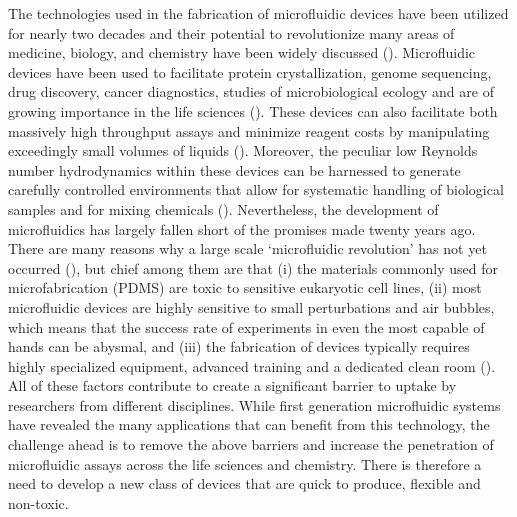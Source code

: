 \documentclass{jfm}
\begin{document}
The technologies used in the fabrication of microfluidic devices have been utilized for nearly two decades and their potential to revolutionize many areas of medicine, biology, and chemistry have been widely discussed (\cite{Xia1998SOFTLITHOGRAPHY,Whitesides2006TheMicrofluidics}). 
Microfluidic devices have been used to facilitate protein crystallization, genome sequencing, drug discovery, cancer diagnostics, studies of microbiological ecology and are of growing importance in the life sciences (\cite{Holmes2010TheBiology,Paguirigan2008MicrofluidicsAssays,Whitesides2006TheMicrofluidics}).
These devices can also facilitate both massively high throughput assays and minimize reagent costs by manipulating exceedingly small volumes of liquids (\cite{Ren2014NewBiology}). 
Moreover, the peculiar low Reynolds number hydrodynamics within these devices can be harnessed to generate carefully controlled environments that allow for systematic handling of biological samples and for mixing chemicals  (\cite{H.A.StoneA.D.Stroock2004EngineeringLab-on-a-Chip}). 
Nevertheless, the development of microfluidics has largely fallen short of the promises made twenty years ago. 
There are many reasons why a large scale ‘microfluidic revolution’ has not yet occurred (\cite{Sackmann2014TheResearch}), but chief among them are that (i) the materials commonly used for microfabrication (\eg PDMS)   are toxic to sensitive eukaryotic cell lines, (ii) most microfluidic devices are highly sensitive to small perturbations and air bubbles, which means that the success rate of experiments in even the most capable of hands can be abysmal, and (iii) the fabrication of devices typically requires highly specialized equipment, advanced training and a dedicated clean room (\cite{Halldorsson2015AdvantagesDevices,Mehling2014MicrofluidicCulture}). 
All of these factors  contribute to create a significant barrier to uptake by researchers from different disciplines.
While first generation microfluidic systems have revealed the many applications that can benefit from this technology, the challenge ahead is to remove the above barriers and increase the penetration of microfluidic assays across the life sciences and chemistry.
There is therefore a need to develop a new class of devices that are quick to produce, flexible and non-toxic. 
 
\end{document}
